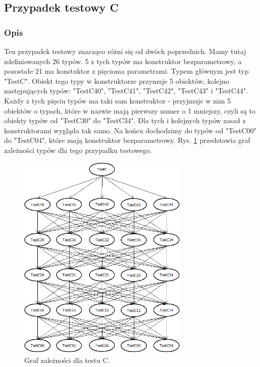 \documentclass[12pt]{article}
\begin{document}
\subsection{Przypadek testowy C}
\subsubsection{Opis}
Ten przypadek testowy znacząco różni się od dwóch poprzednich. Mamy tutaj zdefiniowanych 26 typów. 5 z tych typów ma konstruktor bezparametrowy, a pozostałe 21 ma konstuktor z pięcioma parametrami. Typem głównym jest typ "TestC". Obiekt tego typy w konstruktorze przymuje 5 obiektów, kolejno następujących typów: "TestC40", "TestC41", "TestC42", "TestC43" i "TestC44". Każdy z tych pięciu typów ma taki sam konstruktor - przyjmuje w nim 5 obiektów o typach, które w nazwie mają pierwszy numer o 1 mniejszy, czyli są to obiekty typów od "TestC30" do "TestC34". Dla tych i kolejnych typów zasad z konstruktorami wygląda tak samo. Na końcu dochodzimy do typów od "TestC00" do "TestC04", które mają konstruktor bezparametrowy. Rys. \ref{fig:testC} przedstawia graf zależności typów dla tego przypadku testowego.

\begin{figure}[h]
	\begin{center}
  		\includegraphics[height=10cm]{TestC.png}
  		\caption{Graf zależności dla testu C.}
  		\label{fig:testC}
	\end{center}
\end{figure}
\end{document}
